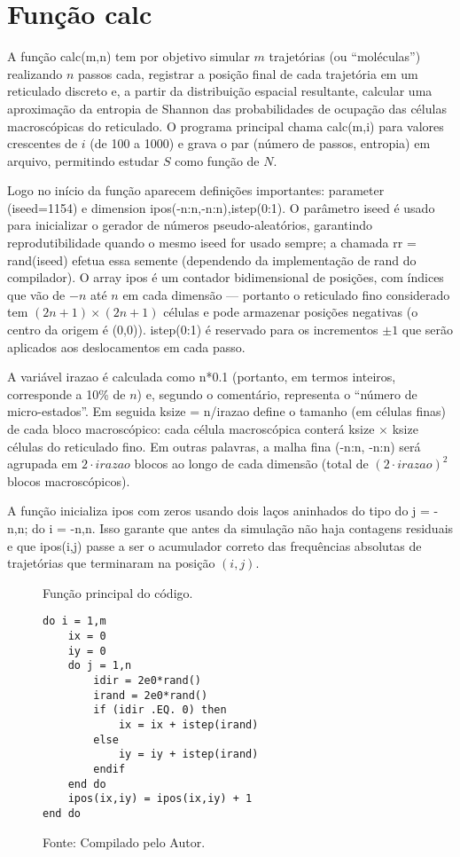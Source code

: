 \newpage
\section*{Função calc}


A função calc(m,n) tem por objetivo simular $m$ trajetórias (ou “moléculas”) realizando $n$ passos
cada, registrar a posição final de cada trajetória em um reticulado discreto e, a partir da distribuição
espacial resultante, calcular uma aproximação da entropia de Shannon das probabilidades de
ocupação das células macroscópicas do reticulado. O programa principal chama calc(m,i) para
valores crescentes de $i$ (de 100 a 1000) e grava o par (número de passos, entropia) em arquivo,
permitindo estudar $S$ como função de $N$.

Logo no início da função aparecem definições importantes: parameter (iseed=1154) e dimension ipos(-n:n,-n:n),istep(0:1). O parâmetro iseed é usado para inicializar o gerador de números
pseudo-aleatórios, garantindo reprodutibilidade quando o mesmo iseed for usado sempre; a
chamada rr = rand(iseed) efetua essa semente (dependendo da implementação de rand do
compilador). O array ipos é um contador bidimensional de posições, com índices que vão de $-n$ até
$n$ em cada dimensão — portanto o reticulado fino considerado tem $(2n+1)\times(2n+1)$ células e
pode armazenar posições negativas (o centro da origem é (0,0)). istep(0:1) é reservado para os
incrementos $\pm 1$ que serão aplicados aos deslocamentos em cada passo.

A variável irazao é calculada como n*0.1 (portanto, em termos inteiros, corresponde a 10\% de $n$)
e, segundo o comentário, representa o “número de micro-estados”. Em seguida ksize = n/irazao define o tamanho 
(em células finas) de cada
bloco macroscópico: cada célula macroscópica conterá ksize $\times$ ksize células do reticulado fino. Em
outras palavras, a malha fina (-n:n, -n:n) será agrupada em $2\cdot irazao$ blocos ao longo de cada
dimensão (total de $(2\cdot irazao)^2$ blocos macroscópicos).

A função inicializa ipos com zeros usando dois laços aninhados do tipo do j = -n,n; do i = -n,n. Isso
garante que antes da simulação não haja contagens residuais e que ipos(i,j) passe a ser o
acumulador correto das frequências absolutas de trajetórias que terminaram na posição $(i,j)$.

\begin{figure}[h!]
\centering
\caption{Função principal do código.}
\centering
\begin{lstlisting}
do i = 1,m
    ix = 0
    iy = 0
    do j = 1,n
        idir = 2e0*rand()
        irand = 2e0*rand()
        if (idir .EQ. 0) then
            ix = ix + istep(irand)
        else
            iy = iy + istep(irand)
        endif
    end do
    ipos(ix,iy) = ipos(ix,iy) + 1
end do

\end{lstlisting}

\caption*{Fonte: Compilado pelo Autor.}
\label{fig:tarefa 4 - função que realiza os cálculos}
\end{figure}



